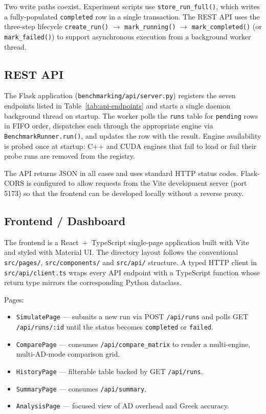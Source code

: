 Two write paths coexist. Experiment scripts use \texttt{store\_run\_full()},
which writes a fully-populated \texttt{completed} row in a single transaction.
The REST API uses the three-step lifecycle
\texttt{create\_run()} $\to$ \texttt{mark\_running()} $\to$
\texttt{mark\_completed()} (or \texttt{mark\_failed()}) to support asynchronous
execution from a background worker thread.

\subsection{REST API}
\label{sec:impl-api}

The Flask application (\texttt{benchmarking/api/server.py}) registers the seven
endpoints listed in Table~\ref{tab:api-endpoints} and starts a single daemon
background thread on startup. The worker polls the \texttt{runs} table for
\texttt{pending} rows in FIFO order, dispatches each through the appropriate
engine via \texttt{BenchmarkRunner.run()}, and updates the row with the result.
Engine availability is probed once at startup: C++ and CUDA engines that fail
to load or fail their probe runs are removed from the registry.

The API returns JSON in all cases and uses standard HTTP status codes. Flask-CORS
is configured to allow requests from the Vite development server (port 5173) so
that the frontend can be developed locally without a reverse proxy.

\subsection{Frontend / Dashboard}
\label{sec:impl-frontend}

The frontend is a React~+~TypeScript single-page application built with Vite
and styled with Material UI. The directory layout follows the conventional
\texttt{src/pages/}, \texttt{src/components/} and \texttt{src/api/} structure.
A typed HTTP client in \texttt{src/api/client.ts} wraps every API endpoint with
a TypeScript function whose return type mirrors the corresponding Python
dataclass.

Pages:

\begin{itemize}
    \item \texttt{SimulatePage} --- submits a new run via POST
          \texttt{/api/runs} and polls GET \texttt{/api/runs/:id} until the
          status becomes \texttt{completed} or \texttt{failed}.
    \item \texttt{ComparePage} --- consumes \texttt{/api/compare\_matrix} to
          render a multi-engine, multi-AD-mode comparison grid.
    \item \texttt{HistoryPage} --- filterable table backed by GET
          \texttt{/api/runs}.
    \item \texttt{SummaryPage} --- consumes \texttt{/api/summary}.
    \item \texttt{AnalysisPage} --- focused view of AD overhead and Greek
          accuracy.
\end{itemize}

